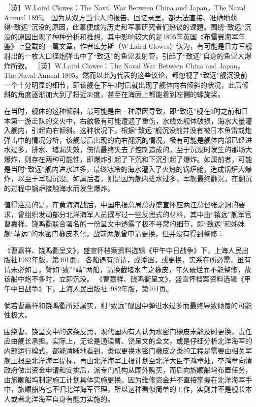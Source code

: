 \documentclass[12pt,UTF8]{ctexbook}
\begin{document}
［英］W.Laird Clowes：The Naval War Between China and Japan，The Naval Annual 1895。
因为从双方当事人的报告、回忆录里，都无法直接、准确地获得“致远”沉没的原因，此事便成为历史和军事研究者们热议的课题。围绕“致远”沉没的原因出现了种种分析和推想，其中影响较大的是1895年英国《布雷赛海军年鉴》上登载的一篇文章，作者库劳斯（W.Laird Clowes）认为，有可能是日方军舰射出的一枚大口径炮弹击中了“致远”的鱼雷发射管，引起了“致远”自身的鱼雷大爆炸所致。 ［英］W.Laird Clowes：The Naval War Between China and Japan，The Naval Annual 1895。然而以此为代表的这些议论，都忽视了“致远”舰沉没前一个十分明显的细节，即该舰在下午3时后就出现了舰体向右倾斜的状况，此后倾斜的角度逐渐加大到了将近30度，甚至在海面上都能看到左侧的螺旋桨。

在当时，舰体的这种倾斜，最可能是由一种原因导致，即“致远”舰在3时之前和日本第一游击队的交火中，右舷极有可能遭遇了重伤，水线处舰体破损，海水大量灌入舰内，引起向右倾斜。这种状况下，根据“致远”舰沉没前并没有被日本鱼雷或炮弹击中的情况分析，该舰最后出现的向右翻沉的情况，极有可能是舰体内部已经进水过多，排水、堵漏失效，伤情最终失去了控制造成的。至于沉没时发生的那场大爆炸，则存在两种可能性，即爆炸引起了下沉和下沉引起了爆炸。如属前者，可能是当时“致远”舰内进水过多，最终冰冷的海水灌入了火热的锅炉舱，造成锅炉大爆炸，以至于军舰沉没。如属后者，则是因为舰内进水过多，军舰最终翻沉，在翻沉的过程中锅炉接触海水而发生爆炸。

值得注意的是，在黄海海战后，中国电报总局总办盛宣怀应两江总督张之洞的要求，曾组织发动部分北洋海军人员撰写过一些反思式的材料，其中由“镇远”舰军官曹嘉祥、饶鸣衢联合署名的一份呈文中透露了极不寻常的细节，即“致远”和姊妹舰“靖远”的水密门橡皮老化，战前两舰曾申请更换，但并没有得到整修：

《曹嘉祥、饶鸣衢呈文》，盛宣怀档案资料选辑《甲午中日战争》下，上海人民出版社1982年版，第401页。
各船遇有所请，或添置，或更换，实系在所必需，虽有请未必如言，譬如“致”“靖”两船，请换截堵水门之橡皮，年久破烂而不能整修，故该船中炮不多时，立即沉没。 《曹嘉祥、饶鸣衢呈文》，盛宣怀档案资料选辑《甲午中日战争》下，上海人民出版社1982年版，第401页。

倘若曹嘉祥和饶鸣衢所述属实，则“致远”舰因中弹进水过多而最终导致倾覆的可能性极大。

围绕曹、饶呈文中的这条反思，现代国内有人认为水密门橡皮未能及时更换，责任应由舰长承担。实际上，无论是通读曹、饶呈文的全文，或是仔细分析北洋海军的内部运行模式，都能清晰地看到，类似更换水密门橡皮之类的工程是需要由相关军舰上报至北洋海军提标，再由北洋海军上报计划至北洋大臣李鸿章处，李鸿章向清政府做出资金申请和安排后，派专门机构从国外购买，而后向旅顺船坞布置任务，由旅顺船坞制定施工计划具体实施更换。因为维修资金并不直接掌握在北洋海军手中，旅顺船坞也不归北洋海军管理，所以这种看似简单的工作，实则并不是舰长本人或者北洋海军自身有能力实施的。
\end{document}
